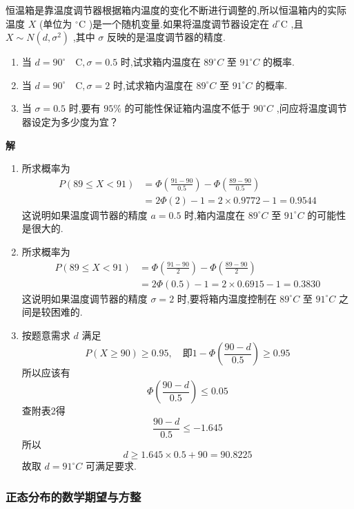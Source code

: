 \begin{example}
	恒温箱是靠温度调节器根据箱内温度的变化不断进行调整的,所以恒温箱内的实际温度 $ X $ (单位为 $ ^{\circ}\mathrm{C} $ )是一个随机变量.如果将温度调节器设定在 $ d^{\circ}\mathrm{C} $ ,且 $ X \sim N\left(d, \sigma^{2}\right) $ ,其中 $ \sigma $ 反映的是温度调节器的精度.
	\begin{enumerate}
		\item 当 $ d=90 ^{\circ}\quad \mathrm{C}, \sigma=0.5 $ 时,试求箱内温度在 $ 89^{\circ}C $ 至 $ 91^{\circ}C $ 的概率.
		\item 当 $ d=90 ^{\circ}\quad \mathrm{C}, \sigma=2 $ 时,试求箱内温度在 $ 89^{\circ}C $ 至 $ 91^{\circ}C $ 的概率.
		\item 当 $ \sigma=0.5 $ 时,要有 $ 95\% $ 的可能性保证箱内温度不低于 $ 90^{\circ}C $ ,问应将温度调节器设定为多少度为宜？
	\end{enumerate}
	
	\textbf{解}
	\begin{enumerate}
		\item 所求概率为
		\[
		\begin{aligned} P(89 \leqslant X<91) &=\Phi\left(\frac{91-90}{0.5}\right)-\Phi\left(\frac{89-90}{0.5}\right) \\ &=2 \Phi(2)-1=2 \times 0.9772-1=0.9544 \end{aligned}
		\]
		这说明如果温度调节器的精度 $ a=0.5 $ 时,箱内温度在 $ 89^{\circ}C $ 至 $ 91^{\circ}C $ 的可能性是很大的.
		\item 所求概率为
		\[
		\begin{aligned} P(89 \leqslant X<91) &=\Phi\left(\frac{91-90}{2}\right)-\Phi\left(\frac{89-90}{2}\right) \\ &=2 \Phi(0.5)-1=2 \times 0.6915-1=0.3830 \end{aligned}
		\]
		这说明如果温度调节器的精度 $ \sigma=2 $ 时,要将箱内温度控制在 $ 89^{\circ}C $ 至 $ 91^{\circ}C $ 之间是较困难的.
		\item 按题意需求 $ d $ 满足
		\[
		P(X \geqslant 90) \geqslant 0.95, \quad \text {即} 1-\Phi\left(\frac{90-d}{0.5}\right) \geqslant 0.95
		\]
		所以应该有
		\[
		\Phi\left(\frac{90-d}{0.5}\right) \leqslant 0.05
		\]
		查附表2得
		\[
		\frac{90-d}{0.5} \leqslant-1.645
		\]
		所以
		\[
		d \geqslant 1.645 \times 0.5+90=90.8225
		\]
		故取 $ d=91^{\circ}C $ 可满足要求.
	\end{enumerate}
\end{example}

\subsubsection{正态分布的数学期望与方整}

